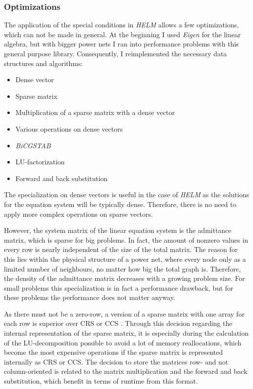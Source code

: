 \subsubsection{Optimizations}
The application of the special conditions in \emph{HELM} allows a few optimizations, which can not be made in general. At the beginning I used \emph{Eigen} for the linear algebra, but with bigger power nets I ran into performance problems with this general purpose library. Consequently, I reimplemented the necessary data structures and algorithms:
\begin{itemize}
	\item Dense vector
	\item Sparse matrix
	\item Multiplication of a sparse matrix with a dense vector
	\item Various operations on dense vectors
	\item \emph{BiCGSTAB}
	\item LU-factorization
	\item Forward and back substitution
\end{itemize}

The specialization on dense vectors is useful in the case of \emph{HELM} as the solutions for the equation system will be typically dense. Therefore, there is no need to apply more complex operations on sparse vectors.

However, the system matrix of the linear equation system is the admittance matrix, which is sparse for big problems. In fact, the amount of nonzero values in every row is nearly independent of the size of the total matrix. The reason for this lies within the physical structure of a power net, where every node only as a limited number of neighbours, no matter how big the total graph is. Therefore, the density of the admittance matrix decreases with a growing problem size. For small problems this specialization is in fact a performance drawback, but for these problems the performance does not matter anyway.

As there must not be a zero-row, a version of a sparse matrix with one array for each row is superior over CRS \cite{sparseMatricesJava} or CCS \cite{sparseMatricesJava}. Through this decision regarding the internal representation of the sparse matrix, it is especially during the calculation of the LU-decomposition possible to avoid a lot of memory reallocations, which become the most expensive operations if the sparse matrix is represented internally as CRS or CCS. The decision to store the matrices row- and not column-oriented is related to the matrix multiplication and the forward and back substitution, which benefit in terms of runtime from this format.

